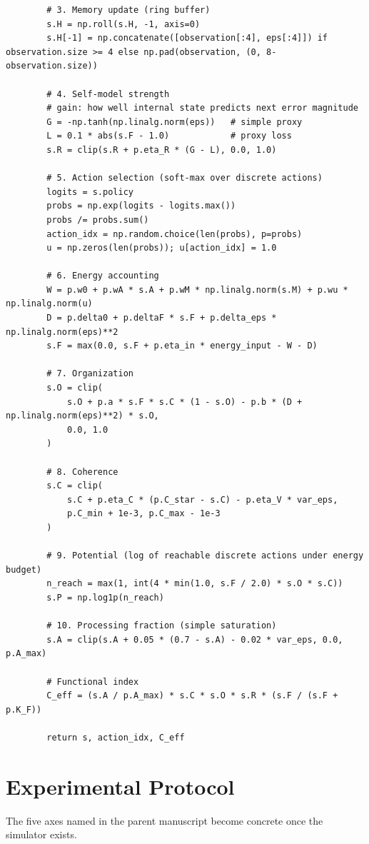 \documentclass[11pt,a4paper]{article}
\begin{document}
\begin{lstlisting}
        # 3. Memory update (ring buffer)
        s.H = np.roll(s.H, -1, axis=0)
        s.H[-1] = np.concatenate([observation[:4], eps[:4]]) if observation.size >= 4 else np.pad(observation, (0, 8-observation.size))

        # 4. Self-model strength
        # gain: how well internal state predicts next error magnitude
        G = -np.tanh(np.linalg.norm(eps))   # simple proxy
        L = 0.1 * abs(s.F - 1.0)            # proxy loss
        s.R = clip(s.R + p.eta_R * (G - L), 0.0, 1.0)

        # 5. Action selection (soft-max over discrete actions)
        logits = s.policy
        probs = np.exp(logits - logits.max())
        probs /= probs.sum()
        action_idx = np.random.choice(len(probs), p=probs)
        u = np.zeros(len(probs)); u[action_idx] = 1.0

        # 6. Energy accounting
        W = p.w0 + p.wA * s.A + p.wM * np.linalg.norm(s.M) + p.wu * np.linalg.norm(u)
        D = p.delta0 + p.deltaF * s.F + p.delta_eps * np.linalg.norm(eps)**2
        s.F = max(0.0, s.F + p.eta_in * energy_input - W - D)

        # 7. Organization
        s.O = clip(
            s.O + p.a * s.F * s.C * (1 - s.O) - p.b * (D + np.linalg.norm(eps)**2) * s.O,
            0.0, 1.0
        )

        # 8. Coherence
        s.C = clip(
            s.C + p.eta_C * (p.C_star - s.C) - p.eta_V * var_eps,
            p.C_min + 1e-3, p.C_max - 1e-3
        )

        # 9. Potential (log of reachable discrete actions under energy budget)
        n_reach = max(1, int(4 * min(1.0, s.F / 2.0) * s.O * s.C))
        s.P = np.log1p(n_reach)

        # 10. Processing fraction (simple saturation)
        s.A = clip(s.A + 0.05 * (0.7 - s.A) - 0.02 * var_eps, 0.0, p.A_max)

        # Functional index
        C_eff = (s.A / p.A_max) * s.C * s.O * s.R * (s.F / (s.F + p.K_F))

        return s, action_idx, C_eff
\end{lstlisting}

\section{Experimental Protocol}

The five axes named in the parent manuscript become concrete once the simulator exists.
\end{document}
